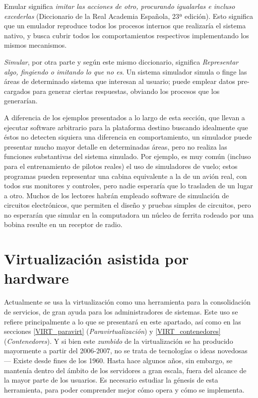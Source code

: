 \documentclass[11pt,fleqn]{book} %
\begin{document}
Emular significa \emph{imitar las acciones de otro, procurando igualarlas e incluso excederlas} (Diccionario de la Real Academia Española, 23ª
edición). Esto significa que un emulador reproduce todos los procesos
internos que realizaría el sistema nativo, y busca cubrir todos los
comportamientos respectivos implementando los mismos mecanismos.

\emph{Simular}, por otra parte y según este mismo diccionario, significa
\emph{Representar algo, fingiendo o imitando lo que no es}. Un sistema
simulador simula o finge las áreas de determinado sistema que
interesan al usuario; puede emplear datos pre-cargados para generar
ciertas respuestas, obviando los procesos que los generarían.

A diferencia de los ejemplos presentados a lo largo de esta sección,
que llevan a ejecutar software arbitrario para la plataforma destino
buscando idealmente que éstos no detecten siquiera una diferencia en
comportamiento, un simulador puede presentar mucho mayor detalle en
determinadas áreas, pero no realiza las funciones substantivas del
sistema simulado. Por ejemplo, es muy común (incluso para el
entrenamiento de pilotos reales) el uso de simuladores de vuelo; estos
programas pueden representar una cabina equivalente a la de un avión
real, con todos sus monitores y controles, pero nadie esperaría que lo
trasladen de un lugar a otro. Muchos de los lectores habrán empleado
software de simulación de circuitos electrónicos, que permiten el
diseño y pruebas simples de circuitos, pero no esperarán que simular
en la computadora un núcleo de ferrita rodeado por una bobina resulte
en un receptor de radio.
\section{Virtualización asistida por hardware}
\label{sec-9-3}
\label{VIRT_asist_por_hw}


Actualmente se usa la virtualización como una herramienta para la 
consolidación de servicios, de gran ayuda para los
administradores de sistemas. Este uso se refiere principalmente a lo
que se presentará en este apartado, así como en las secciones
\ref{VIRT_paravirt} (\emph{Paravirtualización}) y \ref{VIRT_contenedores}
(\emph{Contenedores}). Y si bien este \emph{zumbido} de la virtualización se ha
producido mayormente a partir del 2006-2007, no se trata de
tecnologías o ideas novedosas — Existe desde fines de los 1960. Hasta
hace algunos años, sin embargo, se mantenía dentro del ámbito de los
servidores a gran escala, fuera del alcance de la mayor parte de los
usuarios. Es necesario estudiar la génesis de esta herramienta, para poder
comprender mejor cómo opera y cómo se implementa.
\end{document}
